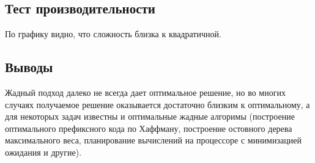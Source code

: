 \documentclass[12pt]{article}
\begin{document}
\subsection*{Тест производительности}


По графику видно, что сложность близка к квадратичной.\\
\subsection*{Выводы}

Жадный подход далеко не всегда дает оптимальное решение, но во многих случаях получаемое решение оказывается достаточно близким к оптимальному, а для некоторых задач известны и оптимальные жадные алгоримы (построение оптимального префиксного кода по Хаффману, построение остовного дерева максимального веса, планирование вычислений на процессоре с минимизацией ожидания и другие).
\end{document}

